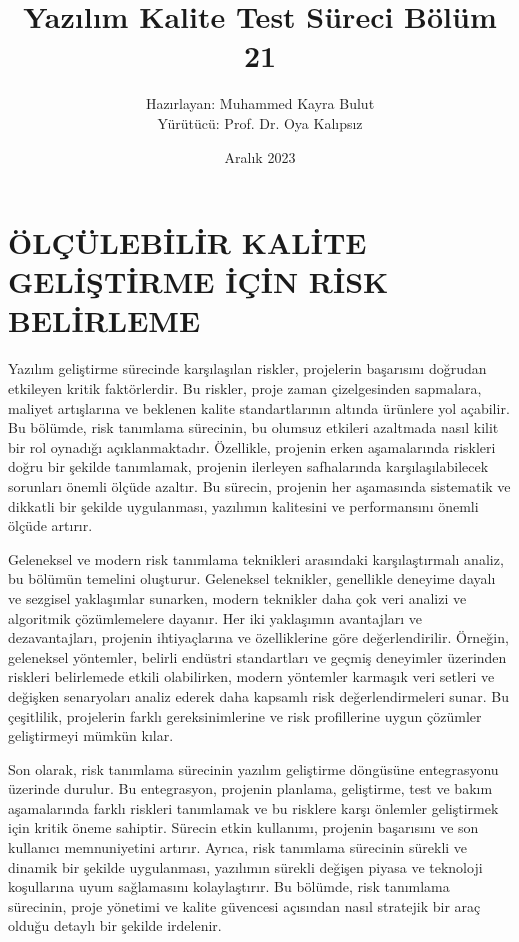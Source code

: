 \documentclass{article}
\title{Yazılım Kalite Test Süreci Bölüm 21}
\author{Hazırlayan: Muhammed Kayra Bulut \\
Yürütücü: Prof. Dr. Oya Kalıpsız}
\date{Aralık 2023}
\begin{document}
\maketitle

\section{ÖLÇÜLEBİLİR KALİTE GELİŞTİRME İÇİN RİSK BELİRLEME}

Yazılım geliştirme sürecinde karşılaşılan riskler, projelerin başarısını doğrudan etkileyen kritik faktörlerdir. Bu riskler, proje zaman çizelgesinden sapmalara, maliyet artışlarına ve beklenen kalite standartlarının altında ürünlere yol açabilir. Bu bölümde, risk tanımlama sürecinin, bu olumsuz etkileri azaltmada nasıl kilit bir rol oynadığı açıklanmaktadır. Özellikle, projenin erken aşamalarında riskleri doğru bir şekilde tanımlamak, projenin ilerleyen safhalarında karşılaşılabilecek sorunları önemli ölçüde azaltır. Bu sürecin, projenin her aşamasında sistematik ve dikkatli bir şekilde uygulanması, yazılımın kalitesini ve performansını önemli ölçüde artırır.

Geleneksel ve modern risk tanımlama teknikleri arasındaki karşılaştırmalı analiz, bu bölümün temelini oluşturur. Geleneksel teknikler, genellikle deneyime dayalı ve sezgisel yaklaşımlar sunarken, modern teknikler daha çok veri analizi ve algoritmik çözümlemelere dayanır. Her iki yaklaşımın avantajları ve dezavantajları, projenin ihtiyaçlarına ve özelliklerine göre değerlendirilir. Örneğin, geleneksel yöntemler, belirli endüstri standartları ve geçmiş deneyimler üzerinden riskleri belirlemede etkili olabilirken, modern yöntemler karmaşık veri setleri ve değişken senaryoları analiz ederek daha kapsamlı risk değerlendirmeleri sunar. Bu çeşitlilik, projelerin farklı gereksinimlerine ve risk profillerine uygun çözümler geliştirmeyi mümkün kılar.

Son olarak, risk tanımlama sürecinin yazılım geliştirme döngüsüne entegrasyonu üzerinde durulur. Bu entegrasyon, projenin planlama, geliştirme, test ve bakım aşamalarında farklı riskleri tanımlamak ve bu risklere karşı önlemler geliştirmek için kritik öneme sahiptir. Sürecin etkin kullanımı, projenin başarısını ve son kullanıcı memnuniyetini artırır. Ayrıca, risk tanımlama sürecinin sürekli ve dinamik bir şekilde uygulanması, yazılımın sürekli değişen piyasa ve teknoloji koşullarına uyum sağlamasını kolaylaştırır. Bu bölümde, risk tanımlama sürecinin, proje yönetimi ve kalite güvencesi açısından nasıl stratejik bir araç olduğu detaylı bir şekilde irdelenir.
\end{document}
